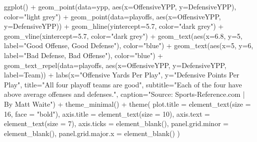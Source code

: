 \documentclass[
]{book}
\newenvironment{Shaded}{\begin{snugshade}}{\end{snugshade}}
\newcommand{\AttributeTok}[1]{\textcolor[rgb]{0.77,0.63,0.00}{#1}}
\newcommand{\DecValTok}[1]{\textcolor[rgb]{0.00,0.00,0.81}{#1}}
\newcommand{\FloatTok}[1]{\textcolor[rgb]{0.00,0.00,0.81}{#1}}
\newcommand{\FunctionTok}[1]{\textcolor[rgb]{0.00,0.00,0.00}{#1}}
\newcommand{\NormalTok}[1]{#1}
\newcommand{\SpecialCharTok}[1]{\textcolor[rgb]{0.00,0.00,0.00}{#1}}
\newcommand{\StringTok}[1]{\textcolor[rgb]{0.31,0.60,0.02}{#1}}
\begin{document}
\begin{Shaded}
\begin{Highlighting}[]
\FunctionTok{ggplot}\NormalTok{() }\SpecialCharTok{+} 
  \FunctionTok{geom\_point}\NormalTok{(}\AttributeTok{data=}\NormalTok{ypp, }\FunctionTok{aes}\NormalTok{(}\AttributeTok{x=}\NormalTok{OffensiveYPP, }\AttributeTok{y=}\NormalTok{DefensiveYPP), }\AttributeTok{color=}\StringTok{"light grey"}\NormalTok{) }\SpecialCharTok{+}
  \FunctionTok{geom\_point}\NormalTok{(}\AttributeTok{data=}\NormalTok{playoffs, }\FunctionTok{aes}\NormalTok{(}\AttributeTok{x=}\NormalTok{OffensiveYPP, }\AttributeTok{y=}\NormalTok{DefensiveYPP)) }\SpecialCharTok{+}
  \FunctionTok{geom\_hline}\NormalTok{(}\AttributeTok{yintercept=}\FloatTok{5.7}\NormalTok{, }\AttributeTok{color=}\StringTok{"dark grey"}\NormalTok{) }\SpecialCharTok{+} 
  \FunctionTok{geom\_vline}\NormalTok{(}\AttributeTok{xintercept=}\FloatTok{5.7}\NormalTok{, }\AttributeTok{color=}\StringTok{"dark grey"}\NormalTok{) }\SpecialCharTok{+} 
  \FunctionTok{geom\_text}\NormalTok{(}\FunctionTok{aes}\NormalTok{(}\AttributeTok{x=}\FloatTok{6.8}\NormalTok{, }\AttributeTok{y=}\DecValTok{5}\NormalTok{, }\AttributeTok{label=}\StringTok{"Good Offense, Good Defense"}\NormalTok{), }\AttributeTok{color=}\StringTok{"blue"}\NormalTok{) }\SpecialCharTok{+}
  \FunctionTok{geom\_text}\NormalTok{(}\FunctionTok{aes}\NormalTok{(}\AttributeTok{x=}\DecValTok{5}\NormalTok{, }\AttributeTok{y=}\DecValTok{6}\NormalTok{, }\AttributeTok{label=}\StringTok{"Bad Defense, Bad Offense"}\NormalTok{), }\AttributeTok{color=}\StringTok{"blue"}\NormalTok{) }\SpecialCharTok{+}
  \FunctionTok{geom\_text\_repel}\NormalTok{(}\AttributeTok{data=}\NormalTok{playoffs, }\FunctionTok{aes}\NormalTok{(}\AttributeTok{x=}\NormalTok{OffensiveYPP, }\AttributeTok{y=}\NormalTok{DefensiveYPP, }\AttributeTok{label=}\NormalTok{Team)) }\SpecialCharTok{+}
  \FunctionTok{labs}\NormalTok{(}\AttributeTok{x=}\StringTok{"Offensive Yards Per Play"}\NormalTok{, }\AttributeTok{y=}\StringTok{"Defensive Points Per Play"}\NormalTok{, }\AttributeTok{title=}\StringTok{"All four playoff teams are good"}\NormalTok{, }\AttributeTok{subtitle=}\StringTok{"Each of the four have above average offenses and defenses."}\NormalTok{, }\AttributeTok{caption=}\StringTok{"Source: Sports{-}Reference.com | By Matt Waite"}\NormalTok{) }\SpecialCharTok{+}
  \FunctionTok{theme\_minimal}\NormalTok{() }\SpecialCharTok{+} 
  \FunctionTok{theme}\NormalTok{(}
    \AttributeTok{plot.title =} \FunctionTok{element\_text}\NormalTok{(}\AttributeTok{size =} \DecValTok{16}\NormalTok{, }\AttributeTok{face =} \StringTok{"bold"}\NormalTok{),}
    \AttributeTok{axis.title =} \FunctionTok{element\_text}\NormalTok{(}\AttributeTok{size =} \DecValTok{10}\NormalTok{),}
    \AttributeTok{axis.text =} \FunctionTok{element\_text}\NormalTok{(}\AttributeTok{size =} \DecValTok{7}\NormalTok{),}
    \AttributeTok{axis.ticks =} \FunctionTok{element\_blank}\NormalTok{(),}
    \AttributeTok{panel.grid.minor =} \FunctionTok{element\_blank}\NormalTok{(),}
    \AttributeTok{panel.grid.major.x =} \FunctionTok{element\_blank}\NormalTok{()}
\NormalTok{  )}
\end{Highlighting}
\end{Shaded}
\end{document}
